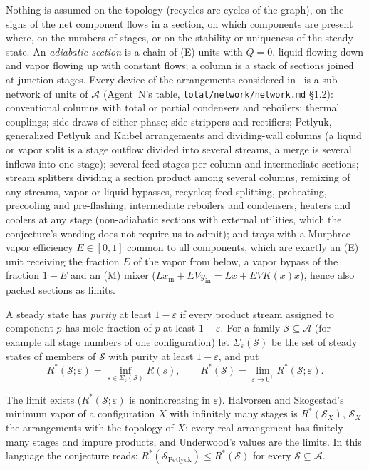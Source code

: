 Nothing is assumed on the topology (recycles are cycles of the graph), on the signs of the net component flows in a
section, on which components are present where, on the numbers of stages, or on the stability or uniqueness of the
steady state. An \emph{adiabatic section} is a chain of (E) units with $Q=0$, liquid flowing down and vapor flowing up
with constant flows; a column is a stack of sections joined at junction stages. Every device of the arrangements
considered in~\autocite{HS3,HalvorsenThesis,TGAT,SA10,Fidkowski2006,Agrawal2003} is a sub-network of units of
$\mathcal A$ (Agent~N's table, \texttt{total/network/network.md} \S1.2): conventional columns with total or partial
condensers and reboilers; thermal couplings; side draws of either phase; side strippers and rectifiers; Petlyuk,
generalized Petlyuk and Kaibel arrangements and dividing-wall columns (a liquid or vapor split is a stage outflow divided
into several streams, a merge is several inflows into one stage); several feed stages per column and intermediate
sections; stream splitters dividing a section product among several columns, remixing of any streams, vapor or liquid
bypasses, recycles; feed splitting, preheating, precooling and pre-flashing; intermediate reboilers and condensers,
heaters and coolers at any stage (non-adiabatic sections with external utilities, which the conjecture's wording does
not require us to admit); and trays with a Murphree vapor efficiency $E\in[0,1]$ common to all components, which are
exactly an (E) unit receiving the fraction $E$ of the vapor from below, a vapor bypass of the fraction $1-E$ and an (M)
mixer ($Lx_{\mathrm{in}}+EVy_{\mathrm{in}}=Lx+EVK(x)x$), hence also packed sections as limits.

\begin{definition}\label{def:limit}
A steady state has \emph{purity} at least $1-\varepsilon$ if every product stream assigned to component $p$ has mole
fraction of $p$ at least $1-\varepsilon$. For a family $\mathcal S\subseteq\mathcal A$ (for example all stage numbers of one
configuration) let $\Sigma_\varepsilon(\mathcal S)$ be the set of steady states of members of $\mathcal S$ with purity at
least $1-\varepsilon$, and put
\[R^*(\mathcal S;\varepsilon)=\inf_{s\in\Sigma_\varepsilon(\mathcal S)}R(s),\qquad R^*(\mathcal S)=\lim_{\varepsilon\to0^+}R^*(\mathcal S;\varepsilon).\]
\end{definition}
The limit exists ($R^*(\mathcal S;\varepsilon)$ is nonincreasing in $\varepsilon$). Halvorsen and Skogestad's minimum vapor of a
configuration $X$ with infinitely many stages is $R^*(\mathcal S_X)$, $\mathcal S_X$ the arrangements with the topology of $X$:
every real arrangement has finitely many stages and impure products, and Underwood's values are the limits. In this
language the conjecture reads: $R^*(\mathcal S_{\mathrm{Petlyuk}})\le R^*(\mathcal S)$ for every $\mathcal S\subseteq\mathcal A$.

